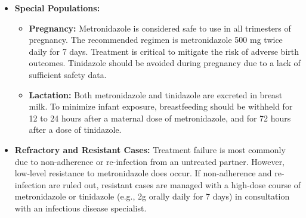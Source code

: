 \begin{itemize}
    \item \textbf{Special Populations:}
    \begin{itemize}
        \item \textbf{Pregnancy:} Metronidazole is considered safe to use in all trimesters of pregnancy. The recommended regimen is metronidazole 500 mg twice daily for 7 days. Treatment is critical to mitigate the risk of adverse birth outcomes. Tinidazole should be avoided during pregnancy due to a lack of sufficient safety data.
        \item \textbf{Lactation:} Both metronidazole and tinidazole are excreted in breast milk. To minimize infant exposure, breastfeeding should be withheld for 12 to 24 hours after a maternal dose of metronidazole, and for 72 hours after a dose of tinidazole.
    \end{itemize}
    \item \textbf{Refractory and Resistant Cases:} Treatment failure is most commonly due to non-adherence or re-infection from an untreated partner. However, low-level resistance to metronidazole does occur. If non-adherence and re-infection are ruled out, resistant cases are managed with a high-dose course of metronidazole or tinidazole (e.g., 2g orally daily for 7 days) in consultation with an infectious disease specialist.
\end{itemize}

